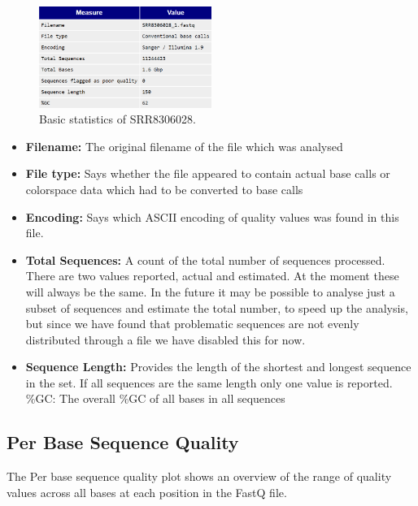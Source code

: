 \documentclass[
  letterpaper,
  DIV=11,
  numbers=noendperiod]{scrreprt}
\begin{document}
\begin{figure}

{\centering \includegraphics[width=0.5\textwidth,height=\textheight]{./assets/20_fqc_basic_stat.png}

}

\caption{Basic statistics of SRR8306028.}

\end{figure}

\begin{itemize}
\item
  \textbf{Filename:} The original filename of the file which was
  analysed
\item
  \textbf{File type:} Says whether the file appeared to contain actual
  base calls or colorspace data which had to be converted to base calls
\item
  \textbf{Encoding:} Says which ASCII encoding of quality values was
  found in this file.
\item
  \textbf{Total Sequences:} A count of the total number of sequences
  processed. There are two values reported, actual and estimated. At the
  moment these will always be the same. In the future it may be possible
  to analyse just a subset of sequences and estimate the total number,
  to speed up the analysis, but since we have found that problematic
  sequences are not evenly distributed through a file we have disabled
  this for now.
\item
  \textbf{Sequence Length:} Provides the length of the shortest and
  longest sequence in the set. If all sequences are the same length only
  one value is reported. \%GC: The overall \%GC of all bases in all
  sequences
\end{itemize}

\hypertarget{per-base-sequence-quality}{%
\subsection{Per Base Sequence Quality}\label{per-base-sequence-quality}}

The Per base sequence quality plot shows an overview of the range of
quality values across all bases at each position in the FastQ file.
\end{document}
